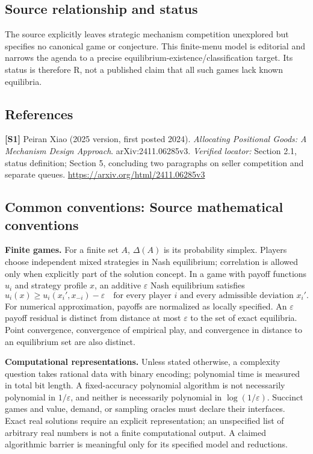 \documentclass[11pt,a4paper]{article}
\begin{document}
\subsection*{Source relationship and status}
The source explicitly leaves strategic mechanism competition unexplored but specifies no canonical game or conjecture. This finite-menu model is editorial and narrows the agenda to a precise equilibrium-existence/classification target. Its status is therefore R, not a published claim that all such games lack known equilibria.
\subsection*{References}
\begingroup\footnotesize\raggedright
\textbf{[S1]} Peiran Xiao (2025 version, first posted 2024). \emph{Allocating Positional Goods: A Mechanism Design Approach}. arXiv:2411.06285v3. \textit{Verified locator:} Section 2.1, status definition; Section 5, concluding two paragraphs on seller competition and separate queues. \url{https://arxiv.org/html/2411.06285v3}
\par\endgroup

\subsection*{Common conventions: Source mathematical conventions}

\textbf{Finite games.} For a finite set $A$, $\Delta(A)$ is its probability
simplex. Players choose independent mixed strategies in Nash equilibrium;
correlation is allowed only when explicitly part of the solution concept.
In a game with payoff functions $u_i$ and strategy profile $x$, an additive
$\varepsilon$ Nash equilibrium satisfies
\[
 u_i(x)\geq u_i(x_i',x_{-i})-\varepsilon
 \quad\text{for every player $i$ and every admissible deviation $x_i'$}.
\]
For numerical approximation, payoffs are normalized as locally specified.
An $\varepsilon$ payoff residual is distinct from distance at most
$\varepsilon$ to the set of exact equilibria. Point convergence, convergence
of empirical play, and convergence in distance to an equilibrium set are
also distinct.

\textbf{Computational representations.} Unless stated otherwise, a complexity
question takes rational data with binary encoding; polynomial time is measured
in total bit length. A fixed-accuracy polynomial algorithm is not necessarily
polynomial in $1/\varepsilon$, and neither is necessarily polynomial in
$\log(1/\varepsilon)$. Succinct games and value, demand, or sampling oracles
must declare their interfaces. Exact real solutions require an explicit
representation; an unspecified list of arbitrary real numbers is not a
finite computational output. A claimed algorithmic barrier is meaningful
only for its specified model and reductions.
\end{document}
